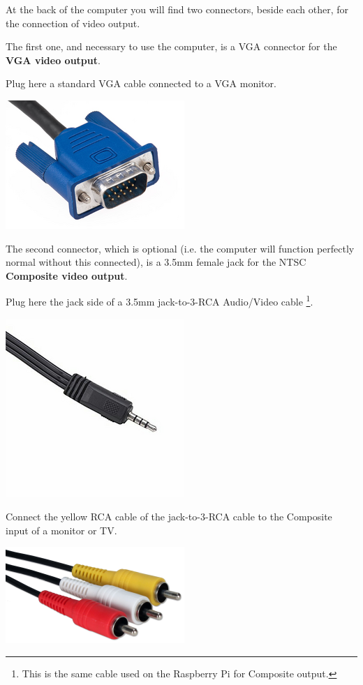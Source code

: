         At the back of the computer you will find two connectors, beside each
        other, for the connection of video output.

        The first one, and necessary to use the computer, is a VGA connector for
        the \textbf{VGA video output}.
        
        Plug here a standard VGA cable connected to a VGA monitor.

        \centerline{\includegraphics[scale=0.5]{images/vgaconn.png}}

        The second connector, which is optional (i.e. the computer will function
        perfectly normal without this connected), is a 3.5mm female jack for the
        NTSC \textbf{Composite video output}.

        Plug here the jack side of a 3.5mm jack-to-3-RCA Audio/Video cable
        \footnote{This is the same cable used on the Raspberry Pi for Composite
        output.}.

        \centerline{\includegraphics[scale=0.5]{images/raspicable_jack.png}}

        Connect the yellow RCA cable of the jack-to-3-RCA cable to the Composite
        input of a monitor or TV.

        \centerline{\includegraphics[scale=0.5]{images/raspicable_rca.png}}

